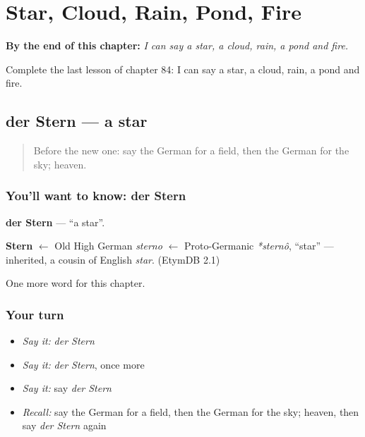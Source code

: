 
\chapter{Star, Cloud, Rain, Pond, Fire}
\label{ch:ge-star-cloud-rain-pond-fire}

\begin{chapteropening}
\textbf{By the end of this chapter:} \emph{I can say a star, a cloud, rain, a pond and fire.}

Complete the last lesson of chapter 84: I can say a star, a cloud, rain, a pond and fire.
\end{chapteropening}

\section[der Stern]{der Stern — a star}

\label{lesson:GE-C84-stern}



\begin{quote}
Before the new one: say the German for a field, then the German for the sky; heaven.
\end{quote}

\subsection*{You'll want to know: der Stern}
\textbf{der Stern} — \textquotedblleft{}a star\textquotedblright{}.

\begin{cousinweb}
\textbf{Stern} $\leftarrow$ Old High German \emph{sterno} $\leftarrow$ Proto-Germanic \emph{*sternô}, \textquotedblleft{}star\textquotedblright{} — inherited, a cousin of English \emph{star}. (EtymDB 2.1)
\end{cousinweb}

\begin{grammarlens}[title={What you've built}]
One more word for this chapter.
\end{grammarlens}

\subsection*{Your turn}
\begin{itemize}
\raggedright
  \item \emph{Say it:} \emph{der Stern}
  \item \emph{Say it:} \emph{der Stern}, once more
  \item \emph{Say it:} say \emph{der Stern}
  \item \emph{Recall:} say the German for a field, then the German for the sky; heaven, then say \emph{der Stern} again
\end{itemize}

